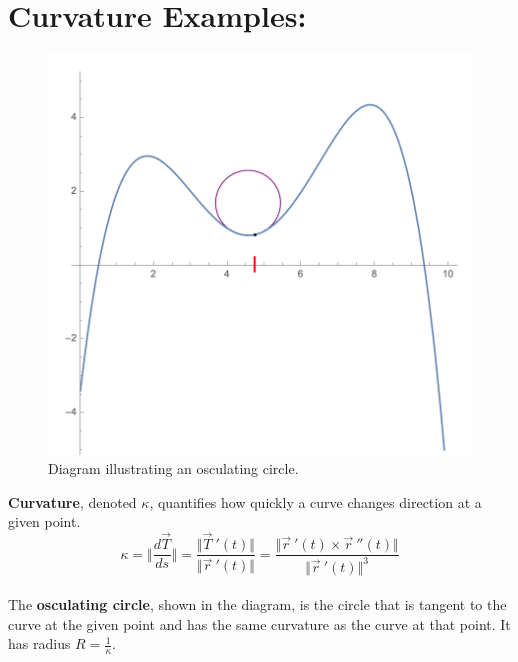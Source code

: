 %
%
%
%
%

%
\section*{Curvature Examples:}

\begin{figure}[!h]
\centering
\includegraphics[width=.75\textwidth]{curvature_picture.png}
\caption{Diagram illustrating an osculating circle.}
\end{figure}
\hspace*{-.5in}
\textbf{Curvature}, denoted \(\kappa\), quantifies how quickly a curve changes direction at a given point. 
\[
\kappa = \Vert \frac{d\vec{T}}{ds}\Vert = \frac{\Vert\vec{T}\ '(t)\Vert}{\Vert\vec{r}\ '(t)\Vert} = \frac{\Vert\vec{r}\ '(t)\times \vec{r}\ ''(t)\Vert}{\Vert\vec{r}\ '(t)\Vert^3}
\]
~\\
The \textbf{osculating circle}, shown in the diagram, is the circle that is tangent to the curve at the given point and has the same curvature as the curve at that point. It has radius \(R=\frac{1}{\kappa}\).

